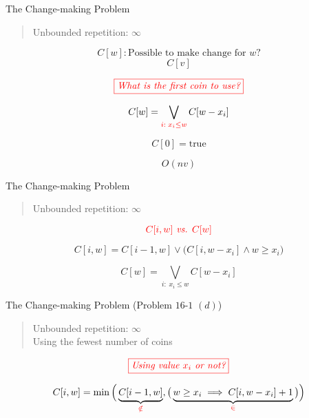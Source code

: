 \begin{frame}{}
  \begin{exampleblock}{The Change-making Problem}
    \begin{quote}
      \centering
      Unbounded repetition: $\infty$
    \end{quote}
  \end{exampleblock}

  \pause
  \[
    C[w]: \text{Possible to make change for $w$?}
  \]
  \[
    C[v]
  \]

  \pause
  \[
    \textcolor{red}{\fbox{\it What is the first coin to use?}}
  \]
  
  \pause
  \[
    C[w] = \bigvee_{\textcolor{red}{i: \; x_i \le w}} C[w-x_i]
  \]

  \pause
  \[
    C[0] = \text{true}
  \]

  \pause
  \[
    O(nv)
  \]
\end{frame}

\begin{frame}{}
  \begin{exampleblock}{The Change-making Problem}
    \begin{quote}
      \centering
      Unbounded repetition: $\infty$
    \end{quote}
  \end{exampleblock}

  \[
    \textcolor{red}{C[i,w] \text{\emph{ vs. }} C[w]}
  \]

  \[
    C[i,w] = C[i-1, w] \lor \big(C[i, w-x_{i}] \land w \ge x_{i}\big)
  \]

  \[
    C[w] = \bigvee_{i: \; x_i \le w} C[w-x_i]
  \]
\end{frame}

\begin{frame}{}
  \begin{exampleblock}{The Change-making Problem (Problem $16$-$1$ $(d)$)}
    \begin{quote}
      \centering
      Unbounded repetition: $\infty$ \\[8pt]
      Using the fewest number of coins
    \end{quote}
  \end{exampleblock}

  \pause
  \[
    \textcolor{red}{\fbox{\it Using value $x_{i}$ or not?}}
  \]

  \vspace{0.30cm}
  \[
    C[i,w] = \min\Big( \underbrace{C[i-1, w]}_{\textcolor{red}{\notin}}, \big(\underbrace{w \ge x_{i} \implies C[i, w-x_{i}] + 1}_{\textcolor{red}{\in}} \big) \Big)
  \]
\end{frame}

